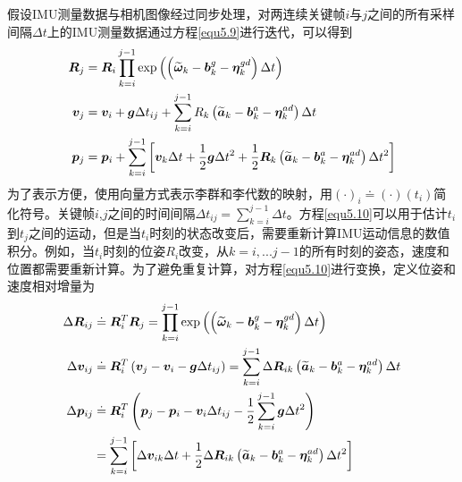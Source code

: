 假设IMU测量数据与相机图像经过同步处理，对两连续关键帧$i$与$j$之间的所有采样间隔$\Delta t$上的IMU测量数据通过方程\eqref{equ5.9}进行迭代，可以得到
\begin{equation}
\label{equ5.10}
\begin{aligned}
\boldsymbol{R}_j &= \boldsymbol{R}_i \prod\limits_{k=i}^{j-1}\exp \left( \left( \widetilde{\boldsymbol{\omega}}_k - \boldsymbol{b}_k^g-\boldsymbol{\eta}_k^{gd} \right) \Delta t  \right) 
\\ 
\boldsymbol{v}_j &= \boldsymbol{v}_i+\boldsymbol{g} \Delta t_{ij} +  \sum\limits_{k=i}^{j-1}R_k \left( \widetilde{\boldsymbol{a}}_k - \boldsymbol{b}_k^a -\boldsymbol{\eta}_k^{ad} \right)\Delta t
\\
\boldsymbol{p}_j &= \boldsymbol{p}_i + \sum\limits_{k=i}^{j-1} \left[ \boldsymbol{v}_k \Delta t + {1 \over 2}\boldsymbol{g}\Delta t^2 + {1 \over 2}\boldsymbol{R}_k \left( \widetilde{\boldsymbol{a}}_k - \boldsymbol{b}_k^a -\boldsymbol{\eta}_k^{ad} \right)\Delta t^2 \right]
\end{aligned}
\end{equation}
为了表示方便，使用向量方式表示李群和李代数的映射，用$(\cdot)_i \doteq (\cdot)(t_i)$简化符号。关键帧$i$,$j$之间的时间间隔$\Delta t_{ij} = \sum_{k=i}^{j-1}\Delta t$。方程\eqref{equ5.10}可以用于估计$t_i$到$t_j$之间的运动，但是当$t_i$时刻的状态改变后，需要重新计算IMU运动信息的数值积分。例如，当$t_i$时刻的位姿$R_i$改变，从$k=i,...j-1$的所有时刻的姿态，速度和位置都需要重新计算。为了避免重复计算，对方程\eqref{equ5.10}进行变换，定义位姿和速度相对增量为
\begin{equation}
\label{equ5.11}
\begin{aligned}
\Delta \boldsymbol{R}_{ij} &\doteq \boldsymbol{R}_i^T \boldsymbol{R}_j = \prod\limits_{k=i}^{j-1}\exp \left( \left( \widetilde{\boldsymbol{\omega}}_k - \boldsymbol{b}_k^g-\boldsymbol{\eta}_k^{gd} \right) \Delta t   \right) 
\\ 
\Delta \boldsymbol{v}_{ij} &\doteq \boldsymbol{R}_i^T\left( \boldsymbol{v}_j-\boldsymbol{v}_i-\boldsymbol{g}\Delta t_{ij}\right) =  \sum\limits_{k=i}^{j-1} \Delta \boldsymbol{R}_{ik} \left( \widetilde{\boldsymbol{a}}_k - \boldsymbol{b}_k^a -\boldsymbol{\eta}_k^{ad} \right)\Delta t
\\ 
\Delta \boldsymbol{p}_{ij} &\doteq \boldsymbol{R}_i^T \left( \boldsymbol{p}_j-\boldsymbol{p}_i-\boldsymbol{v}_i\Delta  t_{ij} - {1 \over 2} \sum\limits_{k=i}^{j-1} \boldsymbol{g} \Delta t^2 \right) \\
&=  \sum\limits_{k=i}^{j-1} \left[ \Delta \boldsymbol{v}_{ik} \Delta t + {1 \over 2}\Delta \boldsymbol{R}_{ik} \left( \widetilde{\boldsymbol{a}}_k - \boldsymbol{b}_k^a -\boldsymbol{\eta}_k^{ad} \right)\Delta t^2 \right]
\end{aligned}
\end{equation}

